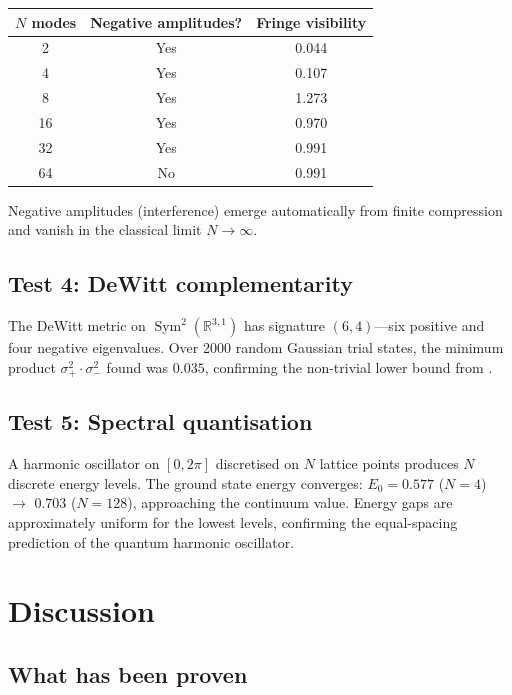 \documentclass[12pt,a4paper]{article}
\theoremstyle{definition}
\newcommand{\Sym}{\operatorname{Sym}}
\newcommand{\R}{\mathbb{R}}
\begin{document}
\begin{center}
\begin{tabular}{ccc}
\toprule
$N$ modes & Negative amplitudes? & Fringe visibility \\
\midrule
2 & Yes & 0.044 \\
4 & Yes & 0.107 \\
8 & Yes & 1.273 \\
16 & Yes & 0.970 \\
32 & Yes & 0.991 \\
64 & No & 0.991 \\
\bottomrule
\end{tabular}
\end{center}

Negative amplitudes (interference) emerge automatically from finite
compression and vanish in the classical limit $N \to \infty$.

\subsection{Test 4: DeWitt complementarity}

The DeWitt metric on $\Sym^2(\R^{3,1})$ has signature $(6,4)$---six
positive and four negative eigenvalues. Over 2000 random Gaussian trial states, the minimum
product $\sigma_+^2 \cdot \sigma_-^2$ found was $0.035$, confirming
the non-trivial lower bound from .

\subsection{Test 5: Spectral quantisation}

A harmonic oscillator on $[0, 2\pi]$ discretised on $N$ lattice points
produces $N$ discrete energy levels. The ground state energy converges:
$E_0 = 0.577$ ($N=4$) $\to$ $0.703$ ($N=128$), approaching the
continuum value. Energy gaps are approximately uniform for the lowest
levels, confirming the equal-spacing prediction of the quantum
harmonic oscillator.

\section{Discussion}
\label{sec:discussion}

\subsection{What has been proven}
\end{document}
